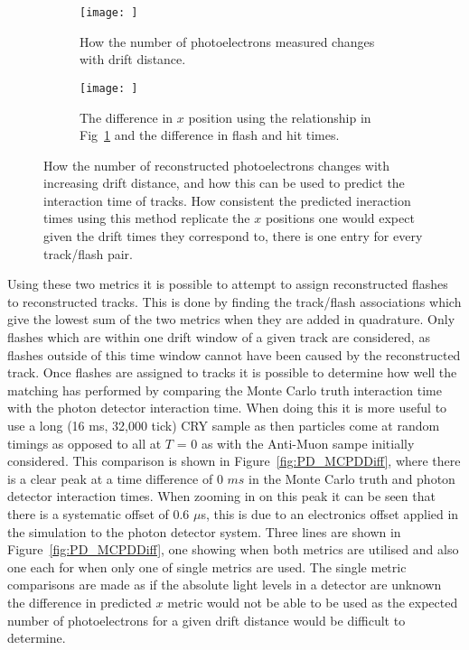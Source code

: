 \begin{figure}[h!]
  \centering
  \begin{subfigure}{0.45\textwidth}
    \centering
    \texttt{[image: ]}
    \caption{How the number of photoelectrons measured changes with drift distance.}
    \label{fig:PD_PExPlot}
  \end{subfigure}
  \hspace{0.08\textwidth}
  \begin{subfigure}{0.45\textwidth}
    \centering
    \texttt{[image: ]}
    \caption{The difference in $x$ position using the relationship in Fig~\ref{fig:PD_PExPlot} and the difference in flash and hit times.}
    \label{fig:PD_PEDiffX}
  \end{subfigure}
  \caption[Matching tracks and flashes in the 35 ton using photoelectron information]
          {How the number of reconstructed photoelectrons changes with increasing drift distance, and how this can be used to predict the interaction time of tracks. How consistent the predicted ineraction times using this method replicate the $x$ positions one would expect given the drift times they correspond to, there is one entry for every track/flash pair.}
\end{figure}

Using these two metrics it is possible to attempt to assign reconstructed flashes to reconstructed tracks. This is done by finding the track/flash associations which give the lowest sum of the two metrics when they are added in quadrature. Only flashes which are within one drift window of a given track are considered, as flashes outside of this time window cannot have been caused by the reconstructed track. Once flashes are assigned to tracks it is possible to determine how well the matching has performed by comparing the Monte Carlo truth interaction time with the photon detector interaction time. When doing this it is more useful to use a long (16 ms, 32,000 tick) CRY sample as then particles come at random timings as opposed to all at $T$ = 0 as with the Anti-Muon sampe initially considered. This comparison is shown in Figure~\ref{fig:PD_MCPDDiff}, where there is a clear peak at a time difference of 0 $ms$ in the Monte Carlo truth and photon detector interaction times. When zooming in on this peak it can be seen that there is a systematic offset of 0.6 $\mu$s, this is due to an electronics offset applied in the simulation to the photon detector system. Three lines are shown in Figure~\ref{fig:PD_MCPDDiff}, one showing when both metrics are utilised and also one each for when only one of single metrics are used. The single metric comparisons are made as if the absolute light levels in a detector are unknown the difference in predicted $x$ metric would not be able to be used as the expected number of photoelectrons for a given drift distance would be difficult to determine.

